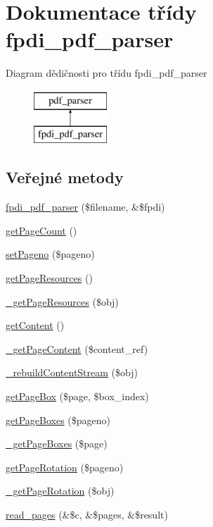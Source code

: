 \hypertarget{classfpdi__pdf__parser}{\section{Dokumentace třídy fpdi\-\_\-pdf\-\_\-parser}
\label{classfpdi__pdf__parser}
}
Diagram dědičnosti pro třídu fpdi\-\_\-pdf\-\_\-parser\begin{figure}[H]
\begin{center}
\leavevmode
\includegraphics[height=2.000000cm]{classfpdi__pdf__parser}
\end{center}
\end{figure}
\subsection*{Veřejné metody}
\begin{DoxyCompactItemize}
\item 
\hyperlink{classfpdi__pdf__parser_a283aec17be4149f64bad648a2801517e}{fpdi\-\_\-pdf\-\_\-parser} (\$filename, \&\$fpdi)
\item 
\hyperlink{classfpdi__pdf__parser_aecd0fec084300a00f7d640bd1667ffa8}{get\-Page\-Count} ()
\item 
\hyperlink{classfpdi__pdf__parser_abc12d1246a01cb20e823f0dc6e4b4920}{set\-Pageno} (\$pageno)
\item 
\hyperlink{classfpdi__pdf__parser_a854d78906b68932993fd276c72c3ad84}{get\-Page\-Resources} ()
\item 
\hyperlink{classfpdi__pdf__parser_abde5d5decc0c49062941e162e675ae5f}{\-\_\-get\-Page\-Resources} (\$obj)
\item 
\hyperlink{classfpdi__pdf__parser_a16be3c83d9f7ebfe1482a9266c2c2732}{get\-Content} ()
\item 
\hyperlink{classfpdi__pdf__parser_a662bbcc4f60ab8edb1df9bf39cfa1190}{\-\_\-get\-Page\-Content} (\$content\-\_\-ref)
\item 
\hyperlink{classfpdi__pdf__parser_ab7c9e6c5e9e68ae31f70a8241c53d894}{\-\_\-rebuild\-Content\-Stream} (\$obj)
\item 
\hyperlink{classfpdi__pdf__parser_afea253f07ba0611ace1028065a67868e}{get\-Page\-Box} (\$page, \$box\-\_\-index)
\item 
\hyperlink{classfpdi__pdf__parser_a21278f36792ce561fcbd90fa3f7acf5f}{get\-Page\-Boxes} (\$pageno)
\item 
\hyperlink{classfpdi__pdf__parser_a72b62f6165dda82836687c56d9e6db00}{\-\_\-get\-Page\-Boxes} (\$page)
\item 
\hyperlink{classfpdi__pdf__parser_ab0006a5903179eca6cd67cf485f032d3}{get\-Page\-Rotation} (\$pageno)
\item 
\hyperlink{classfpdi__pdf__parser_a26b7f3bf21fd30793a905a29249b7915}{\-\_\-get\-Page\-Rotation} (\$obj)
\item 
\hyperlink{classfpdi__pdf__parser_abecb49de0d0173292ef79e5603ab910d}{read\-\_\-pages} (\&\$c, \&\$pages, \&\$result)
\end{DoxyCompactItemize}
